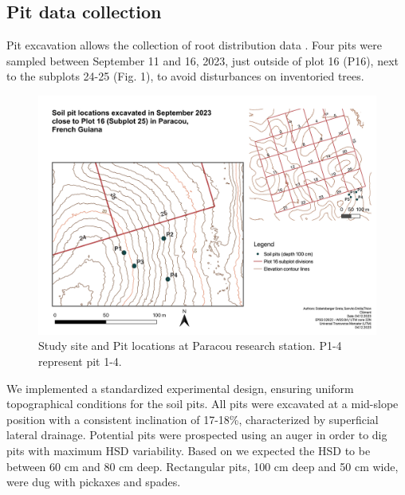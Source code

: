 \documentclass[fleqn,11pt]{latex/stylish_article} %
\begin{document}
\hypertarget{pit-data-collection}{%
\subsection{Pit data collection}\label{pit-data-collection}}

Pit excavation allows the collection of root distribution data \citep{freschetStartingGuideRoot2021}. Four pits were sampled between September 11 and 16, 2023, just outside of plot 16 (P16), next to the subplots 24-25 (Fig. 1), to avoid disturbances on inventoried trees.



\scriptsize

\begin{figure}

{\centering \includegraphics[width=0.9\linewidth]{images/Pitlocations2} 

}

\caption{Study site and Pit locations at Paracou research station. P1-4 represent pit 1-4.}\label{fig:Pitlocations2}
\end{figure}

\normalsize

We implemented a standardized experimental design, ensuring uniform topographical conditions for the soil pits. All pits were excavated at a mid-slope position with a consistent inclination of 17-18\%, characterized by superficial lateral drainage. Potential pits were prospected using an auger in order to dig pits with maximum HSD variability. Based on \citep{epronSpatialVariationSoil2006} we expected the HSD to be between 60 cm and 80 cm deep. Rectangular pits, 100 cm deep and 50 cm wide, were dug with pickaxes and spades.
\end{document}
